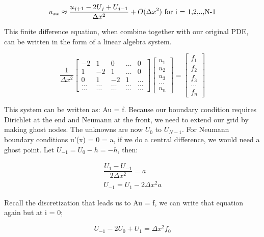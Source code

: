 \documentclass{article}
\begin{document}
\begin{equation*}
u_{xx} \approx \dfrac{u_{j+1}-2U_j+U_{j-1}}{\Delta x^2} + O(\Delta x^2)\\
\text{ for i = 1,2,..,N-1}
\end{equation*}

\noindent
This finite difference equation, when combine together with our original PDE, can be written in the form of a linear algebra system. 

\[
\dfrac{1}{\Delta x^2}\begin{bmatrix}
-2 & 1 & 0 & \dots & 0 \\
1 & -2 & 1 & \dots & 0 \\
0 & 1 & -2 & 1 & \dots \\
\dots  & \dots  & \dots  & \dots & \dots  \\
\dots & \dots & \dots & \dots & \dots 
\end{bmatrix}
\begin{bmatrix}
u_1 \\ u_2 \\ u_3 \\ \dots \\ u_n 
\end{bmatrix}
=
\begin{bmatrix}
f_1 \\ f_2 \\ f_3 \\ \dots \\ f_n 
\end{bmatrix}
\]

\noindent
This system can be written as: Au = f. Because our boundary condition requires Dirichlet at the end and Neumann at the front, we need to extend our grid by making ghost nodes.  The unknowns are now $U_0$ to $U_{N-1}$. For Neumann boundary conditions u'(x) = 0 = a, if we do a central difference, we would need a ghost point.  Let $U_{-1} = U_0 - h = -h$, then: 

\begin{align*}
	\dfrac{U_1 - U_{-1}}{2\Delta x^2} = a\\ 
	U_{-1} = U_1 - 2\Delta x^2 a
\end{align*}

\noindent
Recall the discretization that leads us to Au = f, we can write that equation again but at i = 0; 

\begin{equation*}
	U_{-1}-2U_0 + U_1 = \Delta x^2 f_0 
\end{equation*}
\end{document}
